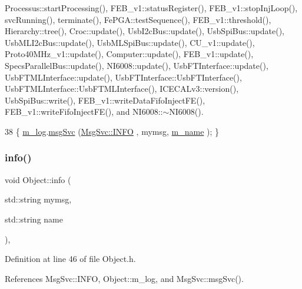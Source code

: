 Processus\+::start\+Processing(), F\+E\+B\+\_\+v1\+::status\+Register(), F\+E\+B\+\_\+v1\+::stop\+Inj\+Loop(), svc\+Running(), terminate(), Fe\+P\+G\+A\+::test\+Sequence(), F\+E\+B\+\_\+v1\+::threshold(), Hierarchy\+::tree(), Croc\+::update(), Usb\+I2c\+Bus\+::update(), Usb\+Spi\+Bus\+::update(), Usb\+M\+L\+I2c\+Bus\+::update(), Usb\+M\+L\+Spi\+Bus\+::update(), C\+U\+\_\+v1\+::update(), Proto40\+M\+Hz\+\_\+v1\+::update(), Computer\+::update(), F\+E\+B\+\_\+v1\+::update(), Specs\+Parallel\+Bus\+::update(), N\+I6008\+::update(), Usb\+F\+T\+Interface\+::update(), Usb\+F\+T\+M\+L\+Interface\+::update(), Usb\+F\+T\+Interface\+::\+Usb\+F\+T\+Interface(), Usb\+F\+T\+M\+L\+Interface\+::\+Usb\+F\+T\+M\+L\+Interface(), I\+C\+E\+C\+A\+Lv3\+::version(), Usb\+Spi\+Bus\+::write(), F\+E\+B\+\_\+v1\+::write\+Data\+Fifo\+Inject\+F\+E(), F\+E\+B\+\_\+v1\+::write\+Fifo\+Inject\+F\+E(), and N\+I6008\+::$\sim$\+N\+I6008().


\begin{DoxyCode}
38 \{ \hyperlink{classObject_a0d269813dd7ac1f24bc143031e2963f2}{m\_log}.\hyperlink{classMsgSvc_ad25f18047920cc59a314e5098259711c}{msgSvc} (\hyperlink{classMsgSvc_ae671eb7301996cd049d2da8a65925926ad2fcf3f3e734fc41ee097cc23670ce51}{MsgSvc::INFO}    , mymsg, \hyperlink{classObject_a8b83c95c705d2c3ba0d081fe1710f48d}{m\_name} ); \}
\end{DoxyCode}
\mbox{\label{classObject_a1ca123253dfd30fc28b156f521dcbdae}} 
\subsubsection{\texorpdfstring{info()}{info()}\hspace{0.1cm}{\footnotesize\ttfamily [2/2]}}
{\footnotesize\ttfamily void Object\+::info (\begin{DoxyParamCaption}\item[{std\+::string}]{mymsg,  }\item[{std\+::string}]{name }\end{DoxyParamCaption})\hspace{0.3cm}{\ttfamily [inline]}, {\ttfamily [inherited]}}



Definition at line 46 of file Object.\+h.



References Msg\+Svc\+::\+I\+N\+FO, Object\+::m\+\_\+log, and Msg\+Svc\+::msg\+Svc().



